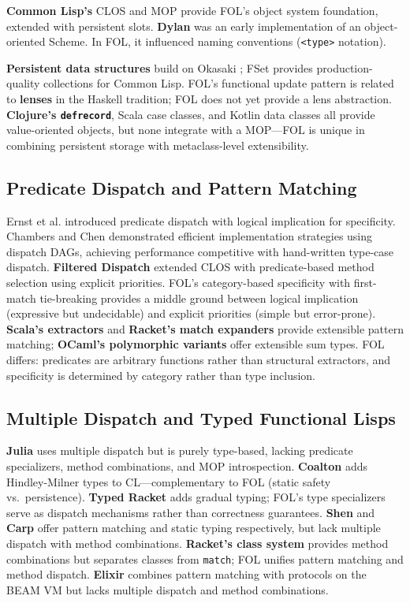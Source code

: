 \documentclass[sigconf,nonacm,review]{acmart}
\begin{document}
\textbf{Common Lisp's} CLOS \cite{Bobrow1988} and MOP \cite{Kiczales1991} provide FOL's object system foundation, extended with persistent slots. \textbf{Dylan} \cite{Apple1992} was an early implementation of an object-oriented Scheme.
In FOL, it influenced naming conventions (\texttt{<type>} notation).

\textbf{Persistent data structures} build on Okasaki \cite{Okasaki1998}; FSet \cite{Burke2007} provides production-quality collections for Common Lisp. FOL's functional update pattern is related to \textbf{lenses} in the
Haskell tradition; FOL does not yet provide a lens abstraction. \textbf{Clojure's \texttt{defrecord}}, Scala case classes, and Kotlin data classes all provide value-oriented objects, but none integrate with a MOP---FOL
is unique in combining persistent storage with metaclass-level extensibility.

\subsection{Predicate Dispatch and Pattern Matching}
Ernst et al. \cite{Ernst1998} introduced predicate dispatch with logical implication for specificity. Chambers and Chen \cite{Chambers1999} demonstrated efficient implementation strategies using dispatch DAGs,
achieving performance competitive with hand-written type-case dispatch. \textbf{Filtered Dispatch} \cite{Orleans2002} extended CLOS with predicate-based method selection using explicit priorities. FOL's category-based
specificity with first-match tie-breaking provides a middle ground between logical implication (expressive but undecidable) and explicit priorities (simple but error-prone). \textbf{Scala's extractors} \cite{Emir2007}
and \textbf{Racket's match expanders} provide extensible pattern matching; \textbf{OCaml's polymorphic variants} \cite{Garrigue1998} offer extensible sum types. FOL differs: predicates are arbitrary functions rather
than structural extractors, and specificity is determined by category rather than type inclusion.

\subsection{Multiple Dispatch and Typed Functional Lisps}

\textbf{Julia} \cite{Bezanson2017} uses multiple dispatch but is purely type-based, lacking predicate specializers, method combinations, and MOP introspection. \textbf{Coalton} \cite{Smith2023} adds Hindley-Milner
types to CL---complementary to FOL (static safety vs.\ persistence). \textbf{Typed Racket} \cite{TobinHochstadt2008} adds gradual typing; FOL's type specializers serve as dispatch mechanisms rather than correctness
guarantees. \textbf{Shen} \cite{Tarver2011} and \textbf{Carp} \cite{Svedang2018} offer pattern matching and static typing respectively, but lack multiple dispatch with method combinations. \textbf{Racket's class system}
\cite{Flatt2006} provides method combinations but separates classes from \texttt{match}; FOL unifies pattern matching and method dispatch. \textbf{Elixir} combines pattern matching with protocols on the BEAM VM but
lacks multiple dispatch and method combinations.
\end{document}
